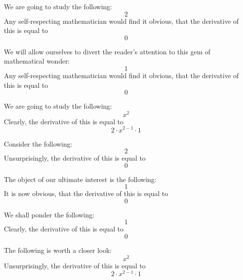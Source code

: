 \documentclass{article}
\begin{document}
We are going to study the following:
\begin{equation}
2 
\end{equation}
Any self-respecting mathematician would find it obvious, that the derivative of this is equal to
\begin{equation}
0 
\end{equation}

We will allow ourselves to divert the reader's attention to this gem of mathematical wonder:
\begin{equation}
1 
\end{equation}
Any self-respecting mathematician would find it obvious, that the derivative of this is equal to
\begin{equation}
0 
\end{equation}

We are going to study the following:
\begin{equation}
x ^{2 } 
\end{equation}
Clearly, the derivative of this is equal to
\begin{equation}
2 \cdot x ^{2 - 1 } \cdot 1 
\end{equation}

Consider the following:
\begin{equation}
2 
\end{equation}
Unsurprisingly, the derivative of this is equal to
\begin{equation}
0 
\end{equation}

The object of our ultimate interest is the following:
\begin{equation}
1 
\end{equation}
It is now obvious, that the derivative of this is equal to
\begin{equation}
0 
\end{equation}

We shall ponder the following:
\begin{equation}
1 
\end{equation}
Clearly, the derivative of this is equal to
\begin{equation}
0 
\end{equation}

The following is worth a closer look:
\begin{equation}
x ^{2 } 
\end{equation}
Unsurprisingly, the derivative of this is equal to
\begin{equation}
2 \cdot x ^{2 - 1 } \cdot 1 
\end{equation}
\end{document}
